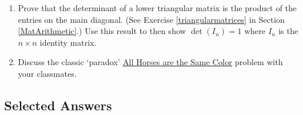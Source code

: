 \begin{enumerate}
\begin{enumerate}
\end{enumerate}

\item  Prove that the determinant of a lower triangular matrix is the product of the entries on the main diagonal.  (See Exercise \ref{triangularmatrices} in Section \ref{MatArithmetic}.)  Use this result to then show $\det\left(I_{n}\right) = 1$ where $I_{n}$ is the $n \times n$ identity matrix.

\item  Discuss the classic  `paradox' \href{http://en.wikipedia.org/wiki/All_horses_are_the_same_color}{\underline{All Horses are the Same Color}} problem with your classmates.

\end{enumerate}

\newpage

\subsection{Selected Answers}

